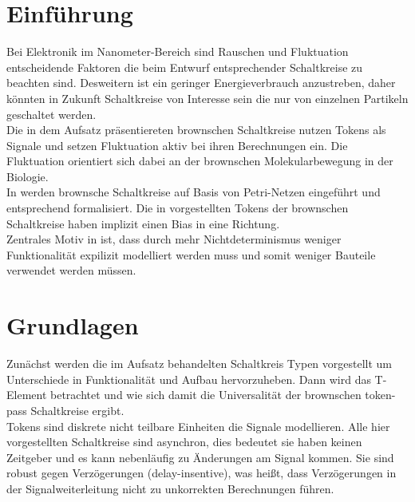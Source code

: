 \documentclass[11pt,a4paper]{article}
\begin{document}
\clearpage

\section{Einführung}
Bei Elektronik im Nanometer-Bereich sind Rauschen und Fluktuation 
entscheidende Faktoren die beim Entwurf entsprechender Schaltkreise 
zu beachten sind.
%
Desweitern ist ein geringer Energieverbrauch anzustreben, daher 
könnten in Zukunft Schaltkreise von Interesse sein die nur von einzelnen 
Partikeln geschaltet werden. \\
%
Die in dem Aufsatz \cite{Peper_nonPolar_2018} präsentiereten brownschen
Schaltkreise nutzen Tokens als Signale und setzen
Fluktuation aktiv bei ihren Berechnungen ein.
%
Die Fluktuation orientiert sich dabei an der brownschen Molekularbewegung 
in der Biologie. \\
%
In \cite{Peper_Fundamentals_2013} werden brownsche Schaltkreise 
auf Basis von Petri-Netzen eingeführt und entsprechend formalisiert.
%
Die in \cite{Peper_Fundamentals_2013} vorgestellten Tokens der brownschen
Schaltkreise haben implizit einen Bias in eine Richtung. \\ 
%
Zentrales Motiv in \cite{Peper_nonPolar_2018} ist, dass durch mehr 
Nichtdeterminismus weniger Funktionalität expilizit modelliert werden muss 
und somit weniger Bauteile verwendet werden müssen.



\section{Grundlagen}
Zunächst werden die im Aufsatz  behandelten Schaltkreis Typen vorgestellt 
um Unterschiede in Funktionalität und Aufbau hervorzuheben.  
%
Dann wird das T-Element betrachtet und wie sich damit die Universalität der
brownschen token-pass Schaltkreise ergibt. \\
%
Tokens sind diskrete nicht teilbare Einheiten die Signale modellieren.
%
Alle hier vorgestellten Schaltkreise sind asynchron, dies bedeutet sie haben
keinen Zeitgeber und es kann nebenläufig zu Änderungen am Signal kommen.
%
Sie sind robust gegen Verzögerungen (delay-insentive),
was heißt, dass Verzögerungen in der Signalweiterleitung 
nicht zu unkorrekten Berechnungen führen.
\end{document}
